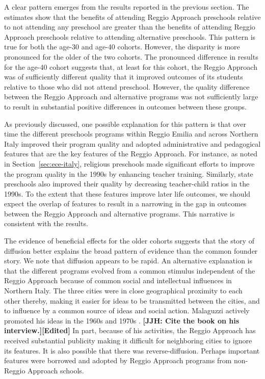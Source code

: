 A clear pattern emerges from the results reported in the previous section. The estimates show that the benefits of attending Reggio Approach preschools relative to not attending any preschool are greater than the benefits of attending Reggio Approach preschools relative to attending alternative preschools. This pattern is true for both the age-30 and age-40 cohorts. However, the disparity is more pronounced for the older of the two cohorts. The pronounced difference in results for the age-40 cohort suggests that, at least for this cohort, the Reggio Approach was of sufficiently different quality that it improved outcomes of its students relative to those who did not attend preschool. However, the quality difference between the Reggio Approach and alternative programs was not sufficiently large to result in substantial positive differences in outcomes between these groups.

As previously discussed, one possible explanation for this pattern is that over time the different preschools programs within Reggio Emilia and across Northern Italy improved their program quality and adopted administrative and pedagogical features that are the key features of the Reggio Approach. For instance, as noted in Section~\ref{sec:ece-italy}, religious preschools made significant efforts to improve the program quality in the 1990s by enhancing teacher training. Similarly, state preschools also improved their quality by decreasing teacher-child ratios in the 1990s. To the extent that these features improve later life outcomes, we should expect the overlap of features to result in a narrowing in the gap in outcomes between the Reggio Approach and alternative programs. This narrative is consistent with the results.

The evidence of beneficial effects for the older cohorts suggests that the story of diffusion better explains the broad pattern of evidence than the common founder story. We note that diffusion appears to be rapid. An alternative explanation is that the different programs evolved from a common stimulus independent of the Reggio Approach because of common social and intellectual influences in Northern Italy. The three cities were in close geographical proximity to each other thereby, making it easier for ideas to be transmitted between the cities, and to influence by a common source of ideas and social action. Malaguzzi actively promoted his ideas in the 1960s and 1970s \citep{Cagliari-etal-eds_2016_BOOK_Loris-Malaguzzi}. \textbf{[JJH: Cite the book on his interview.][Edited]} In part, because of his activities, the Reggio Approach has received substantial publicity making it difficult for neighboring cities to ignore its features. It is also possible that there was reverse-diffusion. Perhaps important features were borrowed and adopted by Reggio Approach programs from non-Reggio Approach schools.

